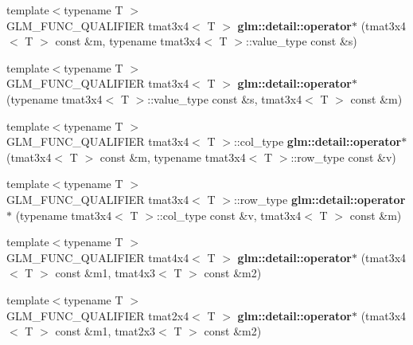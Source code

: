\begin{DoxyCompactItemize}
\item 
\hypertarget{namespaceglm_1_1detail_a6488c5b53957561f308cf265e0e2d1ae}{}{\footnotesize template$<$typename T $>$ }\\G\+L\+M\+\_\+\+F\+U\+N\+C\+\_\+\+Q\+U\+A\+L\+I\+F\+I\+E\+R tmat3x4$<$ T $>$ {\bfseries glm\+::detail\+::operator$\ast$} (tmat3x4$<$ T $>$ const \&m, typename tmat3x4$<$ T $>$\+::value\+\_\+type const \&s)\label{namespaceglm_1_1detail_a6488c5b53957561f308cf265e0e2d1ae}

\item 
\hypertarget{namespaceglm_1_1detail_a2da3fc1f61414061b598db537dd685fc}{}{\footnotesize template$<$typename T $>$ }\\G\+L\+M\+\_\+\+F\+U\+N\+C\+\_\+\+Q\+U\+A\+L\+I\+F\+I\+E\+R tmat3x4$<$ T $>$ {\bfseries glm\+::detail\+::operator$\ast$} (typename tmat3x4$<$ T $>$\+::value\+\_\+type const \&s, tmat3x4$<$ T $>$ const \&m)\label{namespaceglm_1_1detail_a2da3fc1f61414061b598db537dd685fc}

\item 
\hypertarget{namespaceglm_1_1detail_afd29456121c1b2e36f6627eb8743f297}{}{\footnotesize template$<$typename T $>$ }\\G\+L\+M\+\_\+\+F\+U\+N\+C\+\_\+\+Q\+U\+A\+L\+I\+F\+I\+E\+R tmat3x4$<$ T $>$\+::col\+\_\+type {\bfseries glm\+::detail\+::operator$\ast$} (tmat3x4$<$ T $>$ const \&m, typename tmat3x4$<$ T $>$\+::row\+\_\+type const \&v)\label{namespaceglm_1_1detail_afd29456121c1b2e36f6627eb8743f297}

\item 
\hypertarget{namespaceglm_1_1detail_a063f3c5ccf946ef9136daa27baae5f1a}{}{\footnotesize template$<$typename T $>$ }\\G\+L\+M\+\_\+\+F\+U\+N\+C\+\_\+\+Q\+U\+A\+L\+I\+F\+I\+E\+R tmat3x4$<$ T $>$\+::row\+\_\+type {\bfseries glm\+::detail\+::operator$\ast$} (typename tmat3x4$<$ T $>$\+::col\+\_\+type const \&v, tmat3x4$<$ T $>$ const \&m)\label{namespaceglm_1_1detail_a063f3c5ccf946ef9136daa27baae5f1a}

\item 
\hypertarget{namespaceglm_1_1detail_a784b3075664afb40f6eecb4ae12cda1f}{}{\footnotesize template$<$typename T $>$ }\\G\+L\+M\+\_\+\+F\+U\+N\+C\+\_\+\+Q\+U\+A\+L\+I\+F\+I\+E\+R tmat4x4$<$ T $>$ {\bfseries glm\+::detail\+::operator$\ast$} (tmat3x4$<$ T $>$ const \&m1, tmat4x3$<$ T $>$ const \&m2)\label{namespaceglm_1_1detail_a784b3075664afb40f6eecb4ae12cda1f}

\item 
\hypertarget{namespaceglm_1_1detail_a7a8d0c55e1ed2c9d9c705224738da0d2}{}{\footnotesize template$<$typename T $>$ }\\G\+L\+M\+\_\+\+F\+U\+N\+C\+\_\+\+Q\+U\+A\+L\+I\+F\+I\+E\+R tmat2x4$<$ T $>$ {\bfseries glm\+::detail\+::operator$\ast$} (tmat3x4$<$ T $>$ const \&m1, tmat2x3$<$ T $>$ const \&m2)\label{namespaceglm_1_1detail_a7a8d0c55e1ed2c9d9c705224738da0d2}


\end{DoxyCompactItemize}
